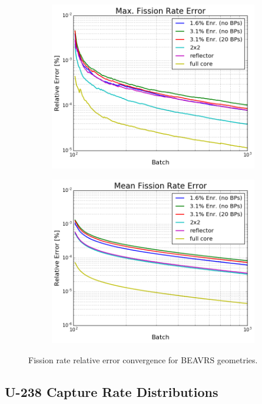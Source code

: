 \begin{figure}[h!]
\centering
\begin{subfigure}{\textwidth}
  \centering
  \includegraphics[width=0.8\linewidth]{figures/benchmarks/fission-rates/fiss-conv-max-assms}
  \caption{}
  \label{fig:chap7-fiss-rate-max-conv-assms}
\end{subfigure}
\begin{subfigure}{\textwidth}
  \centering
  \includegraphics[width=0.8\linewidth]{figures/benchmarks/fission-rates/fiss-conv-mean-assms}
  \caption{}
  \label{fig:chap7-fiss-rate-max-conv-assms}
\end{subfigure}
\caption[Fission rate error convergence for BEAVRS geometries]{Fission rate relative error convergence for \ac{BEAVRS} geometries.}
\label{fig:chap7-fiss-rates-conv}
\end{figure}

\subsection{U-238 Capture Rate Distributions}
\label{subsec:chap7-capture-rates}


